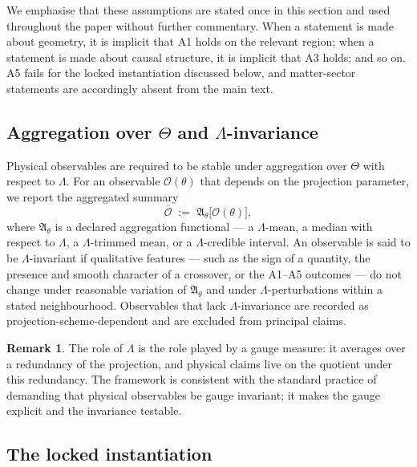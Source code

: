 ﻿\documentclass[12pt,a4paper]{article}
\theoremstyle{definition}
\newtheorem{remark}[theorem]{Remark}
\begin{document}
We emphasise that these assumptions are stated once in this section and used throughout the paper without further commentary. When a statement is made about geometry, it is implicit that A1 holds on the relevant region; when a statement is made about causal structure, it is implicit that A3 holds; and so on. A5 fails for the locked instantiation discussed below, and matter-sector statements are accordingly absent from the main text.

\subsection[Aggregation over Theta and Lambda-invariance]{Aggregation over $\Theta$ and $\Lambda$-invariance}
\label{sec:theta_aggregation}

Physical observables are required to be stable under aggregation over $\Theta$ with respect to $\Lambda$. For an observable $\mathcal{O}(\theta)$ that depends on the projection parameter, we report the aggregated summary
\begin{equation}
\bar{\mathcal{O}} \;:=\; \mathfrak{A}_\theta \big[ \mathcal{O}(\theta) \big],
\end{equation}
where $\mathfrak{A}_\theta$ is a declared aggregation functional --- a $\Lambda$-mean, a median with respect to $\Lambda$, a $\Lambda$-trimmed mean, or a $\Lambda$-credible interval. An observable is said to be $\Lambda$-invariant if qualitative features --- such as the sign of a quantity, the presence and smooth character of a crossover, or the A1--A5 outcomes --- do not change under reasonable variation of $\mathfrak{A}_\theta$ and under $\Lambda$-perturbations within a stated neighbourhood. Observables that lack $\Lambda$-invariance are recorded as projection-scheme-dependent and are excluded from principal claims.

\begin{remark}
The role of $\Lambda$ is the role played by a gauge measure: it averages over a redundancy of the projection, and physical claims live on the quotient under this redundancy. The framework is consistent with the standard practice of demanding that physical observables be gauge invariant; it makes the gauge explicit and the invariance testable.
\end{remark}

\subsection{The locked instantiation}
\label{sec:locked_instantiation}
\end{document}
